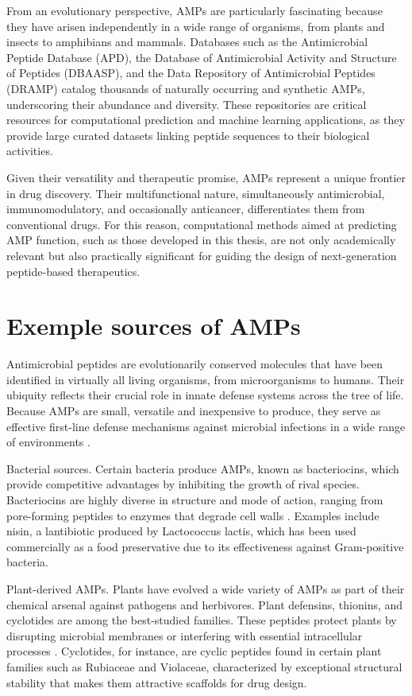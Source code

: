 \documentclass[a4paper,twoside,12pt]{book}
\begin{document}
From an evolutionary perspective, AMPs are particularly fascinating because they have arisen independently in a wide range of organisms, from plants and insects to amphibians and mammals. Databases such as the Antimicrobial Peptide Database (APD), the Database of Antimicrobial Activity and Structure of Peptides (DBAASP), and the Data Repository of Antimicrobial Peptides (DRAMP) catalog thousands of naturally occurring and synthetic AMPs, underscoring their abundance and diversity. These repositories are critical resources for computational prediction and machine learning applications, as they provide large curated datasets linking peptide sequences to their biological activities.

Given their versatility and therapeutic promise, AMPs represent a unique frontier in drug discovery. Their multifunctional nature, simultaneously antimicrobial, immunomodulatory, and occasionally anticancer, differentiates them from conventional drugs. For this reason, computational methods aimed at predicting AMP function, such as those developed in this thesis, are not only academically relevant but also practically significant for guiding the design of next-generation peptide-based therapeutics.

\section{Exemple sources of AMPs}

Antimicrobial peptides are evolutionarily conserved molecules that have been identified in virtually all living organisms, from microorganisms to humans. Their ubiquity reflects their crucial role in innate defense systems across the tree of life. Because AMPs are small, versatile and inexpensive to produce, they serve as effective first-line defense mechanisms against microbial infections in a wide range of environments \cite{bib:wang2014}.

Bacterial sources. Certain bacteria produce AMPs, known as bacteriocins, which provide competitive advantages by inhibiting the growth of rival species. Bacteriocins are highly diverse in structure and mode of action, ranging from pore-forming peptides to enzymes that degrade cell walls \cite{bib:cotter2013}. Examples include nisin, a lantibiotic produced by Lactococcus lactis, which has been used commercially as a food preservative due to its effectiveness against Gram-positive bacteria.

Plant-derived AMPs. Plants have evolved a wide variety of AMPs as part of their chemical arsenal against pathogens and herbivores. Plant defensins, thionins, and cyclotides are among the best-studied families. These peptides protect plants by disrupting microbial membranes or interfering with essential intracellular processes \cite{bib:tam2015}. Cyclotides, for instance, are cyclic peptides found in certain plant families such as Rubiaceae and Violaceae, characterized by exceptional structural stability that makes them attractive scaffolds for drug design.
\end{document}
